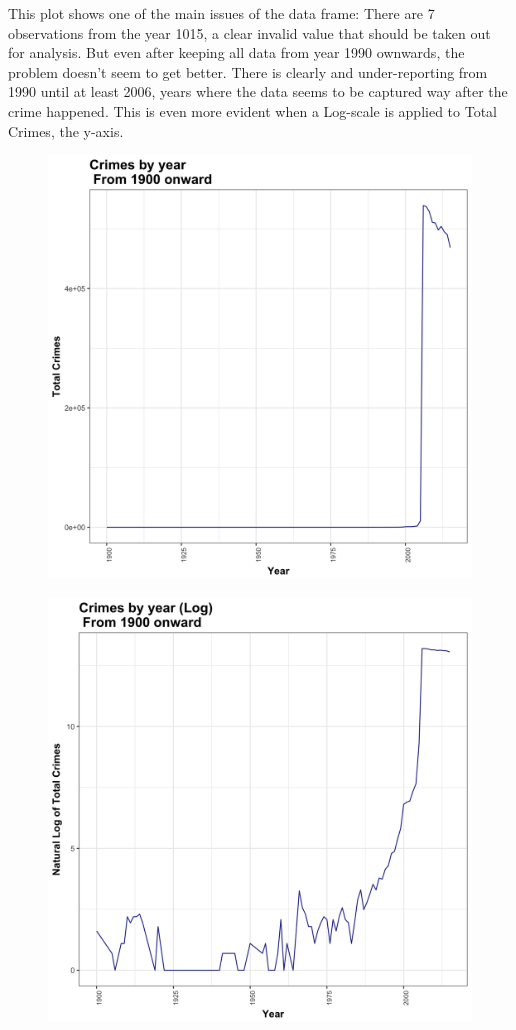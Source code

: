\documentclass{article}
\begin{document}
This plot shows one of the main issues of the data frame: There are 7 observations from the year 1015, a clear invalid value that should be taken out for analysis. But even after keeping all data from year 1990 ownwards, the problem doesn't seem to get better. There is clearly and under-reporting from 1990 until at least 2006, years where the data seems to be captured way after the crime happened. This is even more evident when a Log-scale is applied to Total Crimes, the y-axis.

\begin{figure}[H]
\centering
\includegraphics[scale=0.15]{2_YearlyFrom1900.png}
\end{figure}

\begin{figure}[H]
\centering
\includegraphics[scale=0.15]{3_LogYearlyFrom1900.png}
\end{figure}
\end{document}
